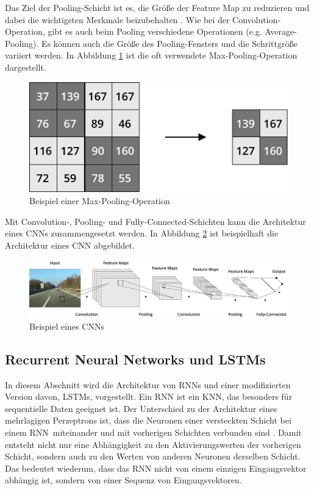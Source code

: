Das Ziel der Pooling-Schicht ist es, die Größe der Feature Map zu reduzieren und dabei die wichtigsten Merkmale beizubehalten \cite{scherer2010evaluation}. Wie bei der Convolution-Operation, gibt es auch beim Pooling verschiedene Operationen (e.g. Average-Pooling). Es können auch die Größe des Pooling-Fensters und die Schrittgröße variiert werden. In Abbildung \ref{fig_pool_operation} ist die oft verwendete Max-Pooling-Operation dargestellt.

\begin{figure}[h]
\centering
\includegraphics[scale=0.4]{images/pool_operation.pdf}
\caption{Beispiel einer Max-Pooling-Operation}
\label{fig_pool_operation}
\end{figure}

Mit Convolution-, Pooling- und Fully-Connected-Schichten kann die Architektur eines \acp{CNN} zusammengesetzt werden. In Abbildung \ref{fig_cnn} ist beispielhaft die Architektur eines \ac{CNN} abgebildet.


\begin{figure}[h]
\centering
\includegraphics[scale=0.2]{images/cnn.pdf}
\caption{Beispiel eines \aclp{CNN}}
\label{fig_cnn}
\end{figure}


\subsection{Recurrent Neural Networks und LSTMs}
\label{grundlagen_nn_rnn}

In diesem Abschnitt wird die Architektur von \acfp{RNN} und einer modifizierten Version davon, \acfp{LSTM}, vorgestellt. Ein \ac{RNN} ist ein \ac{KNN}, das besonders für sequentielle Daten geeignet ist. Der Unterschied zu der Architektur eines mehrlagigen Perzeptrons ist, dass die Neuronen einer versteckten Schicht bei einem \ac{RNN} miteinander und mit vorherigen Schichten verbunden sind \cite{graves2012rnn}. Damit entsteht nicht nur eine Abhängigkeit zu den Aktivierungswerten der vorherigen Schicht, sondern auch zu den Werten von anderen Neuronen derselben Schicht. Das bedeutet wiederum, dass das \ac{RNN} nicht von einem einzigen Eingangsvektor abhängig ist, sondern von einer Sequenz von Eingangsvektoren. 

